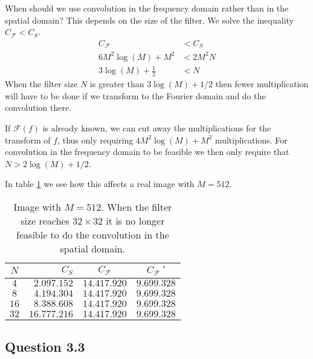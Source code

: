 \documentclass[a4paper, 10pt, final]{article}
\begin{document}
When should we use convolution in the frequency domain rather than in
the spatial domain? This depends on the size of the filter. We solve the
inequality $C_{\mathcal{F}} < C_S$.
\begin{align}
    C_{\mathcal{F}} & < C_S\\
    6M^2\log(M) + M^2 & < 2M^2N\\
    3\log(M) + \frac{1}{2} & < N
\end{align}
When the filter size $N$ is greater than $3\log(M) + 1/2$ then fewer
multiplication will have to be done if we transform to the Fourier
domain and do the convolution there.

If $\mathcal{F}(f)$ is already known, we can cut away the
multiplications for the transform of $f$, thus only requiring
$4M^2\log(M) + M^2$ multiplications. For convolution in the frequency
domain to be feasible we then only require that $N > 2\log(M) + 1/2$.


In table \ref{table_sizes} we see how this affects a real image with
$M = 512$.
\begin{table}[!h]
    \centering
    \begin{tabular}{|c|r|c|c|}
        \hline
        $N$ & $C_S$ & $C_{\mathcal{F}}$ & $C_{\mathcal{F}}~'$\\\hline
        $4$ & $2.097.152$ & $14.417.920$ & $9.699.328$\\
        $8$ & $4.194.304$ & $14.417.920$ & $9.699.328$\\
        $16$ & $8.388.608$ & $14.417.920$ & $9.699.328$\\
        $32$ & $16.777.216$ & $14.417.920$ & $9.699.328$\\
        \hline
    \end{tabular}
    \caption{Image with $M = 512$. When the filter size reaches $32 \times
    32$ it is no longer feasible to do the convolution in the spatial
    domain.}
    \label{table_sizes}
\end{table}

\subsection*{Question 3.3}





\end{document}
